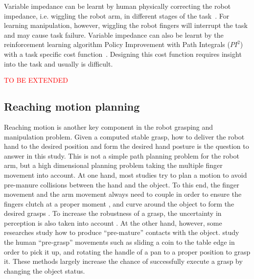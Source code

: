 Variable impedance can be learnt by human physically correcting the robot impedance, i.e. wiggling the robot arm, in different stages of the task~\citep{kronander2012online}. For learning manipulation, however, wiggling the robot fingers will interrupt the task and may cause task failure.
Variable impedance can also be learnt by the reinforcement learning algorithm Policy Improvement with Path Integrals ($PI^2$) with a task specific cost function~\citep{buchli2011learning}. Designing this cost function requires insight into the task and usually is difficult.

\textcolor{red}{TO BE EXTENDED}

\subsection{Reaching motion planning}
\label{cha2:sec1:reaching}

Reaching motion is another key component in the robot grasping and manipulation problem. Given a computed stable grasp, how to deliver the robot hand to the desired position and form the desired hand posture is the question to answer in this study. This is not a simple path planning problem for the robot arm, but a high dimensional planning problem taking the multiple finger movement into account. At one hand, most studies try to plan a motion to avoid pre-manure collisions between the hand and the object. To this end, the finger movement and the arm movement always need to couple in order to ensure the fingers clutch at a proper moment \citep{Shukla2011CDS}, and curve around the object to form the desired grasps \citep{kroemer2011grasping}. To increase the robustness of a grasp, the uncertainty in perception is also taken into account \citep{stulp2011learning}. At the other hand, however, some researches study how to produce ``pre-mature'' contacts with the object.
\citet{chang2010planning} study the human ``pre-grasp'' movements such as sliding a coin to the table edge in order to pick it up, and rotating the handle of a pan to a proper position to grasp it. These methods largely increase the chance of successfully execute a grasp by changing the object status.
